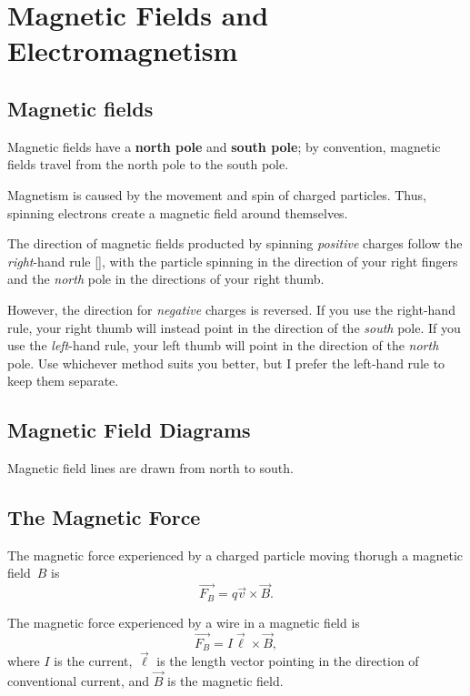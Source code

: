 \chapter{Magnetic Fields and Electromagnetism}

\section{Magnetic fields}

Magnetic fields have a \textbf{north pole} and \textbf{south pole};
by convention, magnetic fields travel from the north pole to the south pole.

Magnetism is caused by the movement and spin of charged particles.
Thus, spinning electrons create a magnetic field around themselves.

The direction of magnetic fields producted by spinning \emph{positive} charges
follow the \emph{right}-hand rule [],
with the particle spinning in the direction of your right fingers
and the \emph{north} pole in the directions of your right thumb.

However, the direction for \emph{negative} charges is reversed.
If you use the right-hand rule,
your right thumb will instead point in the direction of the \emph{south} pole.
If you use the \emph{left}-hand rule,
your left thumb will point in the direction of the \emph{north} pole.
Use whichever method suits you better,
but I prefer the left-hand rule to keep them separate.

\section{Magnetic Field Diagrams}

Magnetic field lines are drawn from north to south.

\section{The Magnetic Force}

The magnetic force experienced by a charged particle
moving thorugh a magnetic field~\(B\) is
\begin{equation}
    \vec{F_B} = q \vec{v} \times \vec{B}.
\end{equation}

The magnetic force experienced by a wire in a magnetic field is
\begin{equation}
    \vec{F_B} = I \vec{\ell} \times \vec{B},
\end{equation}
where \(I\) is the current,
\(\vec{\ell}\) is the length vector
pointing in the direction of conventional current,
and \(\vec{B}\) is the magnetic field.


